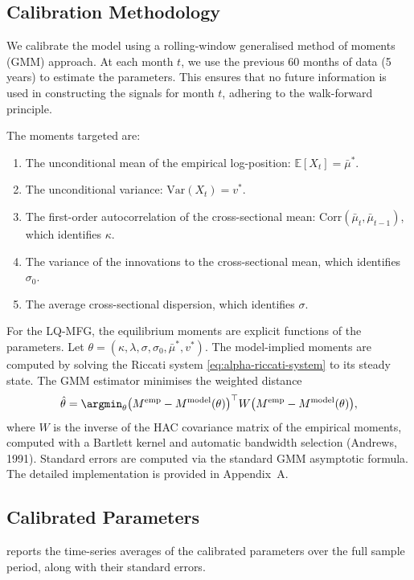 \subsection{Calibration Methodology}

We calibrate the model using a rolling-window generalised method of moments (GMM)
approach. At each month $t$, we use the previous 60 months of data (5 years) to
estimate the parameters. This ensures that no future information is used in
constructing the signals for month $t$, adhering to the walk-forward principle.

The moments targeted are:
\begin{enumerate}
    \item The unconditional mean of the empirical log-position: $\mathbb{E}[X_t] =
    \bar\mu^*$.
    \item The unconditional variance: $\mathrm{Var}(X_t) = v^*$.
    \item The first-order autocorrelation of the cross-sectional mean:
    $\mathrm{Corr}(\bar\mu_t, \bar\mu_{t-1})$, which identifies $\kappa$.
    \item The variance of the innovations to the cross-sectional mean, which
    identifies $\sigma_0$.
    \item The average cross-sectional dispersion, which identifies $\sigma$.
\end{enumerate}

For the LQ-MFG, the equilibrium moments are explicit functions of the parameters.
Let $\theta = (\kappa, \lambda, \sigma, \sigma_0, \bar\mu^*, v^*)$. The
model-implied moments are computed by solving the Riccati system
\eqref{eq:alpha-riccati-system} to its steady state. The GMM estimator minimises
the weighted distance
\[
    \hat\theta = \argmin_\theta \big( M^{\mathrm{emp}} - M^{\mathrm{model}}(\theta)
    \big)^\top W \big( M^{\mathrm{emp}} - M^{\mathrm{model}}(\theta) \big),
\]
where $W$ is the inverse of the HAC covariance matrix of the empirical moments,
computed with a Bartlett kernel and automatic bandwidth selection (Andrews, 1991).
Standard errors are computed via the standard GMM asymptotic formula. The detailed
implementation is provided in Appendix~A.

\subsection{Calibrated Parameters}

 reports the time-series averages of the calibrated
parameters over the full sample period, along with their standard errors.


